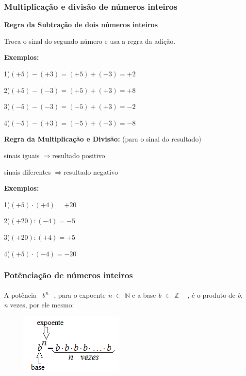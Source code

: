 \subsubsection{Multiplicação e divisão de números inteiros}
 
\begin{center}
    \textbf{Regra da Subtração de dois números inteiros}
\end{center}
\begin{caixa}
Troca o sinal do segundo número e usa a regra da adição.
\end{caixa}
\textbf{Exemplos:}
\begin{multicols}{2}
1)$(+5) - (+ 3) = (+5) + (- 3) = +2$

2)$(+5) - (- 3) = (+5) + (+ 3) = +8$

3)$(-5) - (- 3) = (-5) + (+ 3) = - 2$

4)$(-5) - (+ 3) = (-5) + (- 3) = - 8$
\end{multicols}
\begin{center}
\textbf{Regra da Multiplicação e Divisão: }(para o sinal do resultado)
\end{center}
\begin{caixa}
sinais iguais $\Rightarrow$resultado positivo

sinais diferentes $\Rightarrow$resultado negativo
\end{caixa}

\textbf{Exemplos:}

\begin{multicols}{2}
	1)$(+5) \cdot (+4) = +20$

    2)$(+20) : (-4) = - 5$
    
    3)$ (+20) : (+4) = + 5$
    
    4)$(+5) \cdot (-4) = - 20$
\end{multicols}

\subsubsection{Potênciação de números inteiros}
 
\begin{caixa}
    \begin{tdefinicao}
    A potência~ \textit{b\textsuperscript{n}}~ , para  o expoente \textit{n $ \in $   \( \mathbb{N} \) } e a base \textit{b $ \in $   \( \mathbb{Z} \) ~ ,} é o produto de \textit{b}, \textit{n} vezes,  por ele mesmo:

    \begin{figure}[H]
	    \begin{Center}
		    \includegraphics[width=2.05in,height=1.2in]{capitulos/conjuntos_numericos/media/image8.png}
	    \end{Center}
    \end{figure}
    \end{tdefinicao}
\end{caixa}

